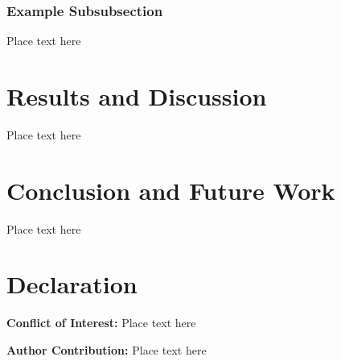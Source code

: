 \documentclass[twoside,twocolumn,10pt]{article}
\begin{document}
\subsubsection{Example Subsubsection}

Place text here

\section{Results and Discussion}

Place text here

\section{Conclusion and Future Work}

Place text here

\section{Declaration}
\fontsize{11}{13}\selectfont

\textbf{Conflict of Interest: } Place text here

\textbf{Author Contribution:} Place text here


\printbibliography%
\end{document}

